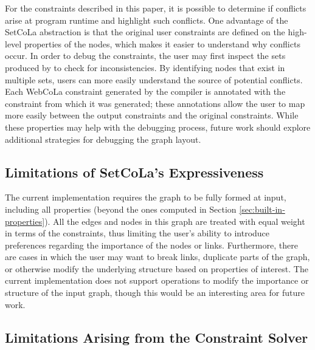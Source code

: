 For the constraints described in this paper, it is possible to determine if
conflicts arise at program runtime and highlight such conflicts. One
advantage of the SetCoLa abstraction is that the original user constraints
are defined on the high-level properties of the nodes, which makes it easier to understand why conflicts occur.
In order to debug the constraints, the user may first inspect the sets produced
by \projectname to check for inconsistencies. By identifying
nodes that exist in multiple sets, users can more easily understand the source
of potential conflicts.  Each WebCoLa constraint generated by the \projectname
compiler is annotated with the \projectname constraint from which it was generated;
these annotations allow the user to map more easily between the output constraints
and the original \projectname constraints. While these properties
may help with the debugging process, future work should explore additional
strategies for debugging the graph layout.

\vspace{-7px}
\subsection{Limitations of SetCoLa's Expressiveness}
The current \projectname implementation requires the graph to be fully formed
at input, including all properties (beyond the ones computed in Section 
\ref{sec:built-in-properties}). All the edges and nodes in this graph are
treated with equal weight in terms of the constraints, thus limiting the user's
ability to introduce preferences regarding the importance of the nodes or links. 
Furthermore, there are cases in which the user may want to break links, duplicate parts of 
the graph, or otherwise modify the underlying structure based on properties of interest.
The current \projectname implementation does not support operations to modify the
importance or structure of the input graph, though this would be an interesting
area for future work.  

\vspace{-7px}
\subsection{Limitations Arising from the Constraint Solver}


